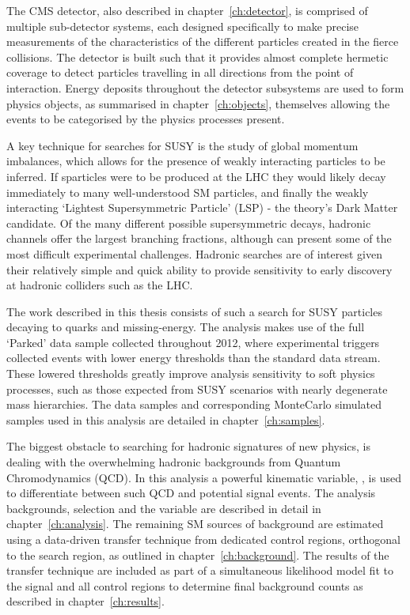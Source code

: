 The CMS detector, also described in chapter~\ref{ch:detector}, is comprised of
multiple sub-detector systems, each designed
specifically to make precise measurements of the characteristics of the
different particles created in the fierce collisions. The detector is built such
that it provides almost
complete hermetic coverage to detect particles travelling in all directions
from the point of interaction. Energy deposits throughout the detector
subsystems are used to form physics objects, as summarised in
chapter~\ref{ch:objects}, themselves allowing the events to be categorised by
the physics processes present.

A key technique
for searches for SUSY is the study of global momentum imbalances,
which allows for the presence of weakly interacting particles to be inferred.
If sparticles were to be produced at the LHC they would likely decay immediately
to many well-understood SM particles, and finally the weakly interacting
`Lightest Supersymmetric Particle' (LSP) - the theory's Dark Matter candidate.
Of the many different possible supersymmetric decays, hadronic channels offer
the largest branching fractions, although can present some of the most
difficult experimental challenges. Hadronic searches are of interest given their
relatively simple and quick ability to provide sensitivity to early discovery at
hadronic colliders such as the LHC.

The work described in this thesis consists of such a search for SUSY particles
decaying to quarks and missing-energy. The analysis makes use of the full
`Parked' data sample collected throughout 2012, where experimental
triggers collected events with lower energy thresholds than the standard data
stream.
These lowered thresholds greatly improve analysis sensitivity to soft
physics
processes, such as those expected from SUSY scenarios with nearly degenerate
mass hierarchies. The data samples and corresponding MonteCarlo simulated
samples used in this analysis are detailed in chapter~\ref{ch:samples}.

The biggest obstacle to
searching for hadronic signatures of new physics, is dealing with the
overwhelming hadronic backgrounds from Quantum Chromodynamics (QCD). In this
analysis a powerful kinematic variable, \alphat, is used to differentiate
between such QCD and potential signal events. The analysis backgrounds,
selection and
the \alphat variable are described in detail in chapter~\ref{ch:analysis}. The
remaining SM sources of background are estimated using a data-driven transfer
technique from dedicated control regions, orthogonal to the search region, as
outlined in chapter~\ref{ch:background}. The results of the transfer technique
are included as part of a simultaneous likelihood model fit to the signal and
all control regions to determine final background counts as described in
chapter~\ref{ch:results}.

